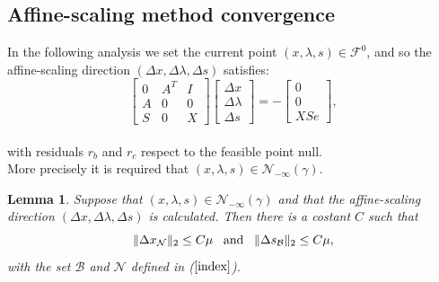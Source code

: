 \documentclass[a4paper,10 pt,titlepage,twoside]{book}
\theoremstyle{plain}
\newtheorem{lem}[thm]{Lemma}
\theoremstyle{definition}
\theoremstyle{remark}
\begin{document}
\subsection{Affine-scaling method convergence}
In the following analysis we set the current point $(x, \lambda, s)\in\mathcal{F}^{0}$, and so the affine-scaling direction $(\Delta x, \Delta \lambda, \Delta s)$ satisfies:\\
\begin{equation}\label{5.1}\tag{4.9}
\begin{bmatrix}
0&A^{T}&I \\A&0&0\\S&0&X
\end{bmatrix}\begin{bmatrix}
\Delta x\\\Delta\lambda \\\Delta s
\end{bmatrix}=-\begin{bmatrix}
0\\0\\XSe
\end{bmatrix},
\end{equation}\\
with residuals $r_{b}$ and $r_{c}$ respect to the feasible point null.\\More precisely it is required that $(x, \lambda, s)\in\mathcal{N}_{- \infty}(\gamma)$.
\begin{lem}
	Suppose that $(x, \lambda, s)\in\mathcal{N}_{- \infty}(\gamma)$ and that the affine-scaling direction $(\Delta x,\Delta \lambda, \Delta s)$ is calculated. Then there is a costant $C$ such that
	\begin{equation*}
	\lVert \Delta x_{\mathcal{N}} \rVert_{2} \leq C \mu \text{\;\;\;and\;\;\;} \lVert \Delta s_\mathcal{B} \rVert_{2} \leq C \mu,
	\end{equation*}
	with the set $\mathcal{B}$ and  $\mathcal{N}$ defined in ($\ref{index}$). 
\end{lem}
\end{document}
